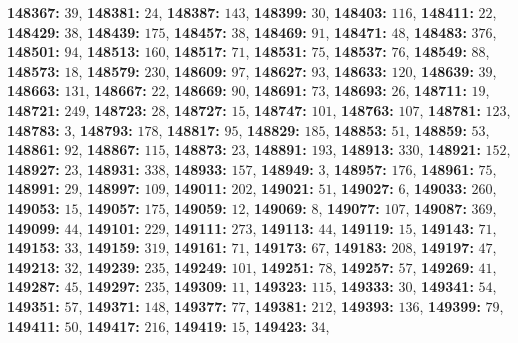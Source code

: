 \textsf{\bfseries 148367:} $39$, \textsf{\bfseries 148381:} $24$, \textsf{\bfseries 148387:} $143$, \textsf{\bfseries 148399:} $30$, \textsf{\bfseries 148403:} $116$, \textsf{\bfseries 148411:} $22$, \textsf{\bfseries 148429:} $38$, \textsf{\bfseries 148439:} $175$, \textsf{\bfseries 148457:} $38$, \textsf{\bfseries 148469:} $91$, \textsf{\bfseries 148471:} $48$, \textsf{\bfseries 148483:} $376$, \textsf{\bfseries 148501:} $94$, \textsf{\bfseries 148513:} $160$, \textsf{\bfseries 148517:} $71$, \textsf{\bfseries 148531:} $75$, \textsf{\bfseries 148537:} $76$, \textsf{\bfseries 148549:} $88$, \textsf{\bfseries 148573:} $18$, \textsf{\bfseries 148579:} $230$, \textsf{\bfseries 148609:} $97$, \textsf{\bfseries 148627:} $93$, \textsf{\bfseries 148633:} $120$, \textsf{\bfseries 148639:} $39$, \textsf{\bfseries 148663:} $131$, \textsf{\bfseries 148667:} $22$, \textsf{\bfseries 148669:} $90$, \textsf{\bfseries 148691:} $73$, \textsf{\bfseries 148693:} $26$, \textsf{\bfseries 148711:} $19$, \textsf{\bfseries 148721:} $249$, \textsf{\bfseries 148723:} $28$, \textsf{\bfseries 148727:} $15$, \textsf{\bfseries 148747:} $101$, \textsf{\bfseries 148763:} $107$, \textsf{\bfseries 148781:} $123$, \textsf{\bfseries 148783:} $3$, \textsf{\bfseries 148793:} $178$, \textsf{\bfseries 148817:} $95$, \textsf{\bfseries 148829:} $185$, \textsf{\bfseries 148853:} $51$, \textsf{\bfseries 148859:} $53$, \textsf{\bfseries 148861:} $92$, \textsf{\bfseries 148867:} $115$, \textsf{\bfseries 148873:} $23$, \textsf{\bfseries 148891:} $193$, \textsf{\bfseries 148913:} $330$, \textsf{\bfseries 148921:} $152$, \textsf{\bfseries 148927:} $23$, \textsf{\bfseries 148931:} $338$, \textsf{\bfseries 148933:} $157$, \textsf{\bfseries 148949:} $3$, \textsf{\bfseries 148957:} $176$, \textsf{\bfseries 148961:} $75$, \textsf{\bfseries 148991:} $29$, \textsf{\bfseries 148997:} $109$, \textsf{\bfseries 149011:} $202$, \textsf{\bfseries 149021:} $51$, \textsf{\bfseries 149027:} $6$, \textsf{\bfseries 149033:} $260$, \textsf{\bfseries 149053:} $15$, \textsf{\bfseries 149057:} $175$, \textsf{\bfseries 149059:} $12$, \textsf{\bfseries 149069:} $8$, \textsf{\bfseries 149077:} $107$, \textsf{\bfseries 149087:} $369$, \textsf{\bfseries 149099:} $44$, \textsf{\bfseries 149101:} $229$, \textsf{\bfseries 149111:} $273$, \textsf{\bfseries 149113:} $44$, \textsf{\bfseries 149119:} $15$, \textsf{\bfseries 149143:} $71$, \textsf{\bfseries 149153:} $33$, \textsf{\bfseries 149159:} $319$, \textsf{\bfseries 149161:} $71$, \textsf{\bfseries 149173:} $67$, \textsf{\bfseries 149183:} $208$, \textsf{\bfseries 149197:} $47$, \textsf{\bfseries 149213:} $32$, \textsf{\bfseries 149239:} $235$, \textsf{\bfseries 149249:} $101$, \textsf{\bfseries 149251:} $78$, \textsf{\bfseries 149257:} $57$, \textsf{\bfseries 149269:} $41$, \textsf{\bfseries 149287:} $45$, \textsf{\bfseries 149297:} $235$, \textsf{\bfseries 149309:} $11$, \textsf{\bfseries 149323:} $115$, \textsf{\bfseries 149333:} $30$, \textsf{\bfseries 149341:} $54$, \textsf{\bfseries 149351:} $57$, \textsf{\bfseries 149371:} $148$, \textsf{\bfseries 149377:} $77$, \textsf{\bfseries 149381:} $212$, \textsf{\bfseries 149393:} $136$, \textsf{\bfseries 149399:} $79$, \textsf{\bfseries 149411:} $50$, \textsf{\bfseries 149417:} $216$, \textsf{\bfseries 149419:} $15$, \textsf{\bfseries 149423:} $34$, 
